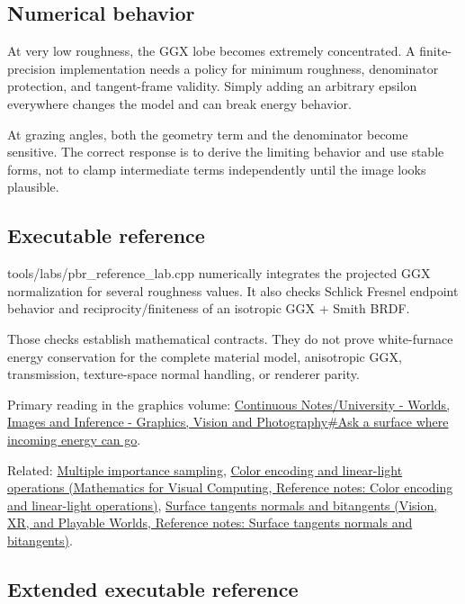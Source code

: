 \subsection{Numerical behavior}\label{appendix-885c1cb64ae9-numerical-behavior}

At very low roughness, the GGX lobe becomes extremely concentrated. A finite-precision implementation needs a policy for minimum roughness, denominator protection, and tangent-frame validity. Simply adding an arbitrary epsilon everywhere changes the model and can break energy behavior.

At grazing angles, both the geometry term and the denominator become sensitive. The correct response is to derive the limiting behavior and use stable forms, not to clamp intermediate terms independently until the image looks plausible.

\subsection{Executable reference}\label{appendix-885c1cb64ae9-executable-reference}

tools/labs/pbr\_reference\_lab.cpp numerically integrates the projected GGX normalization for several roughness values. It also checks Schlick Fresnel endpoint behavior and reciprocity/finiteness of an isotropic GGX + Smith BRDF.

Those checks establish mathematical contracts. They do not prove white-furnace energy conservation for the complete material model, anisotropic GGX, transmission, texture-space normal handling, or renderer parity.

Primary reading in the graphics volume: \hyperref[03-visual-computing-i-ch005-ask-a-surface-where-incoming-energy-can-go]{Continuous Notes/University - Worlds, Images and Inference - Graphics, Vision and Photography\#Ask a surface where incoming energy can go}.

Related: \hyperref[appendix-ca8898faf1a6]{Multiple importance sampling}, \href{../02-Mathematics-for-Visual-Computing/main.pdf\#nameddest=appendix-a9f83ad40792}{Color encoding and linear-light operations (Mathematics for Visual Computing, Reference notes: Color encoding and linear-light operations)}, \href{../07-Vision-XR-and-Playable-Worlds/main.pdf\#nameddest=appendix-e31893dec985}{Surface tangents normals and bitangents (Vision, XR, and Playable Worlds, Reference notes: Surface tangents normals and bitangents)}.

\subsection{Extended executable reference}\label{appendix-885c1cb64ae9-extended-executable-reference}

